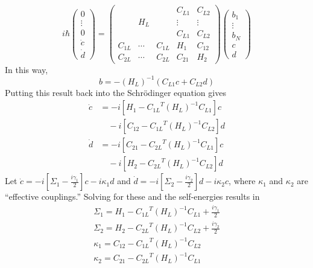 \documentclass[aps,pra,superscriptaddress,twocolumn]{revtex4-1}
\newcommand{\commentSB}[1]{\texttt{\color{blue}[#1]}}
\begin{document}
\begin{equation}
    i \hbar \begin{pmatrix}
        0 \\ \vdots \\ 0 \\ \dot{c} \\ \dot{d}
    \end{pmatrix}
    = \begin{pmatrix}
        ~ & ~ & ~ &   C_{L1} & C_{L2} \\ 
        ~ & H_L & ~ & \vdots & \vdots \\
        ~ & ~ & ~ & C_{L1} &  C_{L2} \\
        C_{1L} & \cdots & C_{1L} & H_1 & C_{12} \\
        C_{2L} & \cdots & C_{2L} & C_{21} & H_2  
    \end{pmatrix} 
    \begin{pmatrix}
        b_1 \\ \vdots \\ b_N \\ c \\ d
    \end{pmatrix}
    \label{eqn:blockH2}
\end{equation} 
In this way, 
\begin{equation}
    b = -(H_L)^{-1} (C_{L1} c + C_{L2} d)
\end{equation}
Putting this result back into the Schr\"odinger equation gives
\begin{subequations}
\begin{align}
    \dot{c} &= -i \left[  H_1 - {C_{1L}}^T (H_L)^{-1} C_{L1}\right] c \nonumber\\
     &\quad- i \left[  C_{12} - {C_{1L}}^T (H_L)^{-1} C_{L2} \right] d \\
    \dot{d} &= -i \left[  C_{21} - {C_{2L}}^T (H_L)^{-1} C_{L1} \right] c \nonumber\\
     &\quad -i \left[  H_2 - {C_{2L}}^T (H_L)^{-1} C_{L2}\right] d
\end{align}
\end{subequations}
Let $\dot{c} = -i [\Sigma_1 - \frac{i \gamma_1}{2}]c - i \kappa_1 d $ and $\dot{d} = -i [ \Sigma_2 - \frac{i \gamma_2}{2} ] d - i \kappa_2 c $, where $\kappa_1$ and $\kappa_2$ are ``effective couplings.'' Solving for these and the self-energies results in 
\begin{subequations}
    \begin{align}
        \Sigma_1 = H_1 - {C_{1L}}^T (H_L)^{-1} C_{L1} + \frac{i \gamma_1}{2} \\
        \Sigma_2 = H_2 - {C_{2L}}^T (H_L)^{-1} C_{L2} + \frac{i \gamma_2}{2} \\
        \kappa_1 = C_{12} - {C_{1L}}^T (H_L)^{-1} C_{L2} \\
        \kappa_2 = C_{21} - {C_{2L}}^T (H_L)^{-1} C_{L1} 
    \end{align}
\end{subequations}
\end{document}
